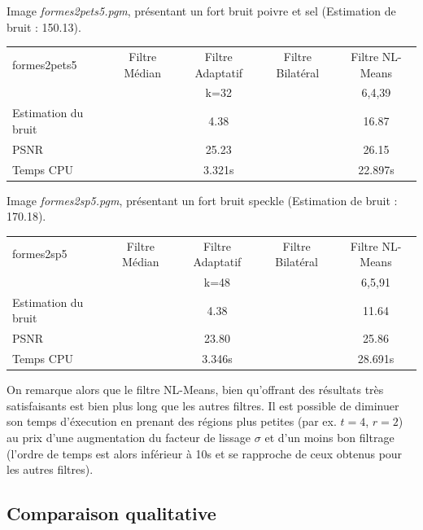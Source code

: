 \documentclass[a4,12pt]{article}
\begin{document}
\vspace{2em}

Image \textit{formes2pets5.pgm}, présentant un fort bruit poivre et sel (Estimation de bruit : 150.13).

\begin{center}
\begin{tabular}{|l||c|c|c|c|}
\hline
formes2pets5  & Filtre Médian & Filtre Adaptatif & Filtre Bilatéral & Filtre NL-Means\\
& & k=32 & & 6,4,39\\
\hline
Estimation du bruit
&
& 4.38
&
& 16.87\\
\hline
PSNR
&
& 25.23
&
& 26.15\\
\hline
Temps CPU
&
& 3.321s
&
& 22.897s\\
\hline
\end{tabular} 
\end{center}

\vspace{2em}

Image \textit{formes2sp5.pgm}, présentant un fort bruit speckle (Estimation de bruit : 170.18).

\begin{center}
\begin{tabular}{|l||c|c|c|c|}
\hline
formes2sp5  & Filtre Médian & Filtre Adaptatif & Filtre Bilatéral & Filtre NL-Means \\
& & k=48 & &6,5,91\\
\hline
Estimation du bruit
&
& 4.38
&
& 11.64\\
\hline
PSNR
&
& 23.80
&
& 25.86\\
\hline
Temps CPU
&
& 3.346s
&
& 28.691s\\
\hline
\end{tabular} 
\end{center}

On remarque alors que le filtre NL-Means, bien qu'offrant des résultats très satisfaisants est bien plus long que les autres filtres. Il est possible de diminuer son temps d'éxecution en prenant des régions plus petites (par ex. $t=4$, $r=2$) au prix d'une augmentation du facteur de lissage $\sigma$ et d'un moins bon filtrage (l'ordre de temps est alors inférieur à 10s et se rapproche de ceux obtenus pour les autres filtres).


\vspace{2em}

\subsection{Comparaison qualitative}
\end{document}
